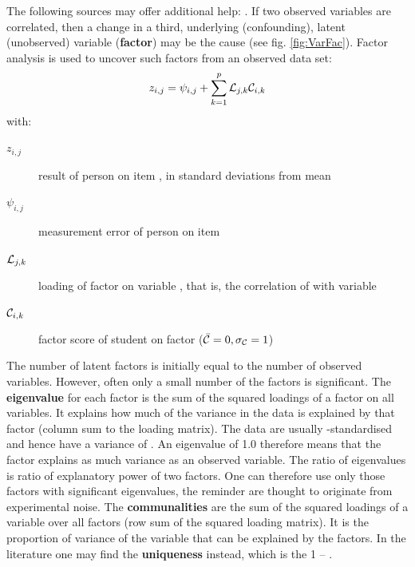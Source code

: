 \begin{refsection}
The following sources may offer additional help: \parencite{Hop-75,Wil-10,Klo-10,Fae-16,Fri-17}. If two observed variables  are correlated, then a change in a third, underlying (confounding), latent (unobserved) variable (\textbf{factor}) may be the cause (see fig. \ref{fig:VarFac}). Factor analysis is used to uncover such factors from an observed data set:
\begin{equation}
     z_{i,j} = \psi_{i,j} + \sum\limits_{k=1}^p \mathcal{L}_{j,k} \mathcal{C}_{i,k}
\end{equation}
with:
\begin{description}
    \item[\( z_{i,j} \)]{result of person  on item , in standard deviations from mean}
    \item[\( \psi_{i,j} \)]{measurement error of person  on item }
    \item[\( \mathcal{L}_{j,k} \)]{loading of factor  on variable , that is, the correlation of  with variable  }
    \item[\( \mathcal{C}_{i,k} \)]{factor score of student  on factor  (\( \bar{\mathcal{C}} = 0, \sigma_{\mathcal{C}} = 1 \))}
\end{description}
The number of latent factors  is initially equal to the number of observed variables. However, often only a small number  of the factors is significant. The \textbf{eigenvalue} for each factor is the sum of the squared loadings of a factor on all variables. It explains how much of the  variance \skalar{\sigma} in the data is explained by that factor (column sum to the loading matrix). The data are usually -standardised and hence have a variance of . An eigenvalue of \num{1.0} therefore means that the factor explains as much variance as an observed variable. The ratio of eigenvalues is ratio of explanatory power of two factors. One can therefore use only those factors with significant eigenvalues, the reminder are thought to originate from experimental noise. The \textbf{communalities}  are the sum of the squared loadings of a variable over all factors (row sum of the squared loading matrix). It is the proportion of variance of the variable that can be explained by the factors. In the literature one may find the \textbf{uniqueness} instead, which is the 1 -- .


\end{refsection}
